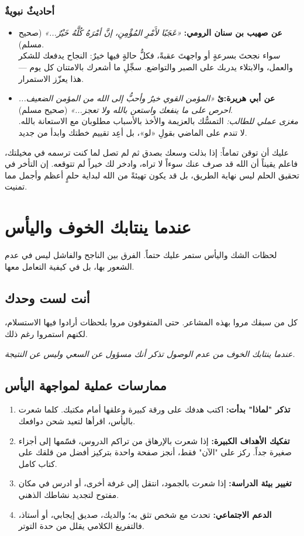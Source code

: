 \documentclass[12pt,a4paper]{book}
\newcommand{\quoteAr}[1]{%
	\begin{myquote}
		\itshape #1
	\end{myquote}
}
\begin{document}
	\subsubsection*{أحاديثٌ نبويةٌ }
	\begin{itemize}
		\item \textbf{عن صهيب بن سنان الرومي:} \emph{«عَجَبًا لأَمْرِ المُؤْمِنِ، إنَّ أمْرَهُ كُلَّهُ خَيْرٌ...»} (صحيح مسلم).\\
		\textit سواء نجحتَ بسرعةٍ أو واجهتَ عقبةً، فكلُّ حالةٍ فيها خيرٌ: النجاح يدفعك للشكر والعمل، والابتلاء يدربك على الصبر والتواضع. سجِّلِ ما أشعرك بالامتنان كل يوم — هذا يعزّز الاستمرار.
		
		\item \textbf{عن أبي هريرة:ئ} \emph{«المؤمن القوي خيرٌ وأحبُّ إلى الله من المؤمن الضعيف... احرص على ما ينفعك واستعن بالله ولا تعجز...»} (صحيح مسلم).\\
		\textit{مغزى عملي للطالب:} التمسُّك بالعزيمة والأخذ بالأسباب مطلوبان مع الاستعانة بالله. لا تندم على الماضي بقولِ «لو»، بل أعِد تقييم خطتك وابدأ من جديد.
	\end{itemize}
	
	عليك أن توقن تماماً: إذا بذلت وسعك بصدق ثم لم تصل لما كنت ترسمه في مخيلتك، فاعلم يقيناً أن الله قد صرف عنك سوءاً لا تراه، وادخر لك خيراً لم تتوقعه. إن التأخر في تحقيق الحلم ليس نهاية الطريق، بل قد يكون تهيئةً من الله لبداية حلمٍ أعظم وأجمل مما تمنيت.
	
	\section{عندما ينتابك الخوف واليأس}
	
	لحظات الشك واليأس ستمر عليك حتماً. الفرق بين الناجح والفاشل ليس في عدم الشعور بها، بل في كيفية التعامل معها.
	
	\subsection{أنت لست وحدك}
	كل من سبقك مروا بهذه المشاعر. حتى المتفوقون مروا بلحظات أرادوا فيها الاستسلام، لكنهم استمروا رغم ذلك.
	
	\quoteAr{عندما ينتابك الخوف من عدم الوصول تذكر أنك مسؤول عن السعي وليس عن النتيجة.}
	
	\subsection{ممارسات عملية لمواجهة اليأس}
	\begin{enumerate}
		\item \textbf{تذكر "لماذا" بدأت:} اكتب هدفك على ورقة كبيرة وعلقها أمام مكتبك. كلما شعرت باليأس، اقرأها لتعيد شحن دوافعك.
		\item \textbf{تفكيك الأهداف الكبيرة:} إذا شعرت بالإرهاق من تراكم الدروس، قسّمها إلى أجزاء صغيرة جداً. ركز على "الآن" فقط، أنجز صفحة واحدة بتركيز أفضل من قلقك على كتاب كامل.
		\item \textbf{تغيير بيئة الدراسة:} إذا شعرت بالجمود، انتقل إلى غرفة أخرى، أو ادرس في مكان مفتوح لتجديد نشاطك الذهني.
		\item \textbf{الدعم الاجتماعي:} تحدث مع شخص تثق به؛ والديك، صديق إيجابي، أو أستاذ، فالتفريغ الكلامي يقلل من حدة التوتر.
	\end{enumerate}
	
\end{document}
